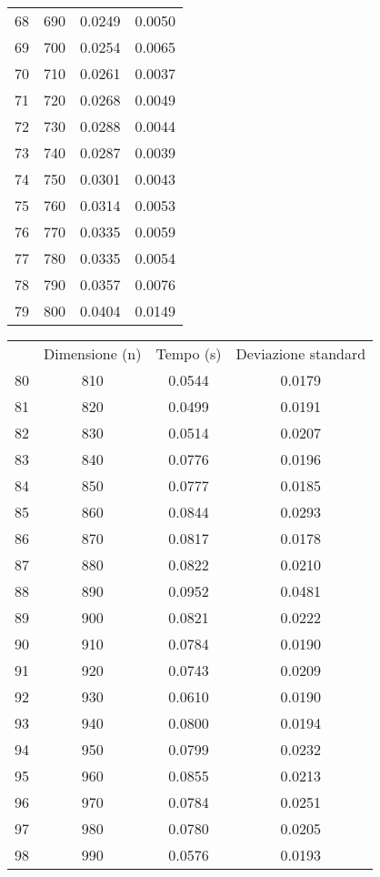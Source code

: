 \begin{table}
\begin{adjustbox}{width=1\textwidth/2}
\begin{tabular}{|c|c|c|c|}
68 & 690 & 0.0249 & 0.0050 \\
\cline{1-4}
69 & 700 & 0.0254 & 0.0065 \\
\cline{1-4}
70 & 710 & 0.0261 & 0.0037 \\
\cline{1-4}
71 & 720 & 0.0268 & 0.0049 \\
\cline{1-4}
72 & 730 & 0.0288 & 0.0044 \\
\cline{1-4}
73 & 740 & 0.0287 & 0.0039 \\
\cline{1-4}
74 & 750 & 0.0301 & 0.0043 \\
\cline{1-4}
75 & 760 & 0.0314 & 0.0053 \\
\cline{1-4}
76 & 770 & 0.0335 & 0.0059 \\
\cline{1-4}
77 & 780 & 0.0335 & 0.0054 \\
\cline{1-4}
78 & 790 & 0.0357 & 0.0076 \\
\cline{1-4}
79 & 800 & 0.0404 & 0.0149 \\
\cline{1-4}
\end{tabular}
\end{adjustbox}
\end{table}

\begin{table}
\centering
\begin{adjustbox}{width=1\textwidth/2}
\begin{tabular}{|c|c|c|c|}
\hline
 & Dimensione (n) & Tempo (s) & Deviazione standard \\
80 & 810 & 0.0544 & 0.0179 \\
\cline{1-4}
81 & 820 & 0.0499 & 0.0191 \\
\cline{1-4}
82 & 830 & 0.0514 & 0.0207 \\
\cline{1-4}
83 & 840 & 0.0776 & 0.0196 \\
\cline{1-4}
84 & 850 & 0.0777 & 0.0185 \\
\cline{1-4}
85 & 860 & 0.0844 & 0.0293 \\
\cline{1-4}
86 & 870 & 0.0817 & 0.0178 \\
\cline{1-4}
87 & 880 & 0.0822 & 0.0210 \\
\cline{1-4}
88 & 890 & 0.0952 & 0.0481 \\
\cline{1-4}
89 & 900 & 0.0821 & 0.0222 \\
\cline{1-4}
90 & 910 & 0.0784 & 0.0190 \\
\cline{1-4}
91 & 920 & 0.0743 & 0.0209 \\
\cline{1-4}
92 & 930 & 0.0610 & 0.0190 \\
\cline{1-4}
93 & 940 & 0.0800 & 0.0194 \\
\cline{1-4}
94 & 950 & 0.0799 & 0.0232 \\
\cline{1-4}
95 & 960 & 0.0855 & 0.0213 \\
\cline{1-4}
96 & 970 & 0.0784 & 0.0251 \\
\cline{1-4}
97 & 980 & 0.0780 & 0.0205 \\
\cline{1-4}
98 & 990 & 0.0576 & 0.0193 \\
\cline{1-4}
\end{tabular}
\end{adjustbox}
\end{table}
